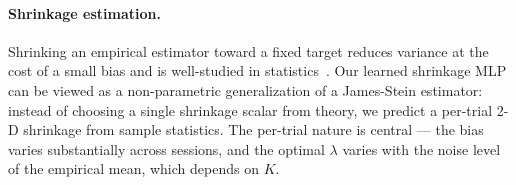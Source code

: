 \paragraph{Shrinkage estimation.}
Shrinking an empirical estimator toward a fixed target reduces variance
at the cost of a small bias and is well-studied in
statistics~\citep{james1961estimation,efron1977stein,ledoit2004wellconditioned}.
Our learned shrinkage MLP can be viewed as a non-parametric
generalization of a James-Stein estimator: instead of choosing a single
shrinkage scalar from theory, we predict a per-trial 2-D shrinkage from
sample statistics. The per-trial nature is central --- the bias varies
substantially across sessions, and the optimal $\lambda$ varies with
the noise level of the empirical mean, which depends on $K$.
